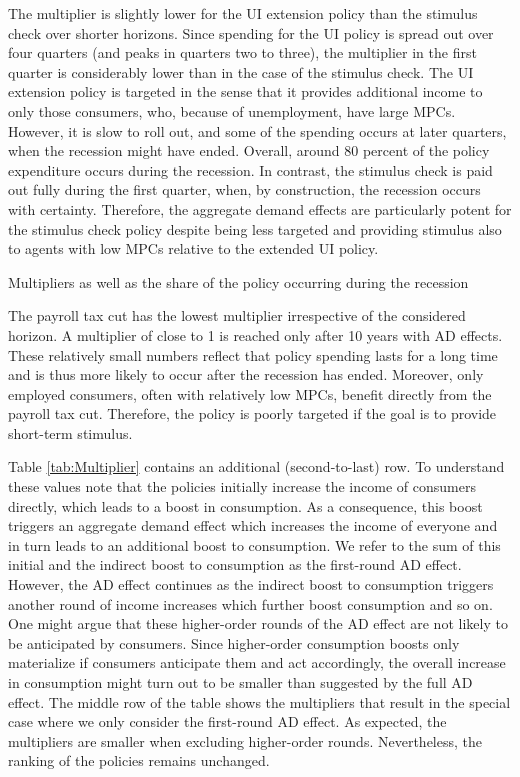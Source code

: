 \documentclass[\econtexRoot/HAFiscal]{subfiles}
\begin{document}
The multiplier is slightly lower for the UI extension policy than the stimulus check over shorter horizons. Since spending for the UI policy is spread out over four quarters (and peaks in quarters two to three), the multiplier in the first quarter is considerably lower than in the case of the stimulus check. The UI extension policy is targeted in the sense that it provides additional income to only those consumers, who, because of unemployment, have large MPCs. However, it is slow to roll out, and some of the spending occurs at later quarters, when the recession might have ended. Overall, around 80 percent of the policy expenditure occurs during the recession. In contrast, the stimulus check is paid out fully during the first quarter, when, by construction, the recession occurs with certainty. Therefore, the aggregate demand effects are particularly potent for the stimulus check policy despite being less targeted and providing stimulus also to agents with low MPCs relative to the extended UI policy.

\begin{table}[t]
  \center
  
  \caption{Multipliers as well as the share of the policy occurring during the recession}
  \notinsubfile{\label{tab:Multiplier}}
\end{table}

The payroll tax cut has the lowest multiplier irrespective of the considered horizon. A multiplier of close to 1 is reached only after 10 years with AD effects. These relatively small numbers reflect that policy spending lasts for a long time and is thus more likely to occur after the recession has ended. Moreover, only employed consumers, often with relatively low MPCs, benefit directly from the payroll tax cut. Therefore, the policy is poorly targeted if the goal is to provide short-term stimulus.

Table \ref{tab:Multiplier} contains an additional (second-to-last) row. To understand these values note that the policies initially increase the income of consumers directly, which leads to a boost in consumption. As a consequence, this boost triggers an aggregate demand effect which increases the income of everyone and in turn leads to an additional boost to consumption. We refer to the sum of this initial and the indirect boost to consumption as the first-round AD effect. However, the AD effect continues as the indirect boost to consumption triggers another round of income increases which further boost consumption and so on. One might argue that these higher-order rounds of the AD effect are not likely to be anticipated by consumers. Since higher-order consumption boosts only materialize if consumers anticipate them and act accordingly, the overall increase in consumption might turn out to be smaller than suggested by the full AD effect. The middle row of the table shows the multipliers that result in the special case where we only consider the first-round AD effect. As expected, the multipliers are smaller when excluding higher-order rounds. Nevertheless, the ranking of the policies remains unchanged.
\end{document}
